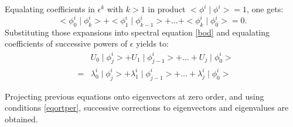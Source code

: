 \documentclass[12pt]{book}
\begin{document}
Equalating coefficients in $\epsilon^k$ with $k > 1$ 
in product
$\mathrel{<} \phi^{i}\mid \phi^{i}\mathrel{>} =1$, one gets:
\begin{equation}
\mathrel{<} \phi^{i}_{0}\mid \phi^{i}_{k}\mathrel{>} +\mathrel{<} \phi^{i}_{1}\mid
\phi^{i}_{k-1}\mathrel{>} +\ldots+\mathrel{<} \phi^{i}_{k}\mid \phi^{i}_{0}\mathrel{>} =0.
\end{equation}
Substituting those expansions into spectral equation \ref{bod} and equalating
coefficients of successive powers of $\epsilon$ yields to:
\begin{eqnarray}
&&U_{0}\mid \phi^{i}_{j}\mathrel{>} +U_{1}\mid \phi^{i}_{j-1}\mathrel{>} +...+U_{j}\mid \phi^{i}_{0}\mathrel{>} \nonumber\\
&=&\lambda_{0}^{i}\mid \phi^{i}_{j}\mathrel{>} +\lambda_{1}^{i}\mid \phi^{i}_{j-1}\mathrel{>} +...
+\lambda_{j}^{i}\mid \phi^{i}_{0}\mathrel{>}  \label{oivj}
\end{eqnarray}

Projecting previous equations onto eigenvectors at zero order, and using
conditions \ref{eqortper}, successive corrections to eigenvectors and
eigenvalues are obtained.
\end{document}
